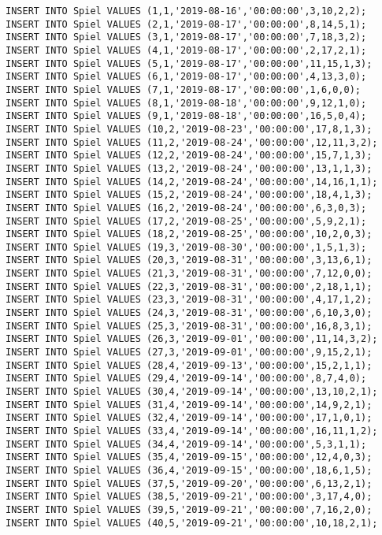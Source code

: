 \documentclass{bschlangaul-aufgabe}
\begin{document}
\begin{verbatim}
INSERT INTO Spiel VALUES (1,1,'2019-08-16','00:00:00',3,10,2,2);
INSERT INTO Spiel VALUES (2,1,'2019-08-17','00:00:00',8,14,5,1);
INSERT INTO Spiel VALUES (3,1,'2019-08-17','00:00:00',7,18,3,2);
INSERT INTO Spiel VALUES (4,1,'2019-08-17','00:00:00',2,17,2,1);
INSERT INTO Spiel VALUES (5,1,'2019-08-17','00:00:00',11,15,1,3);
INSERT INTO Spiel VALUES (6,1,'2019-08-17','00:00:00',4,13,3,0);
INSERT INTO Spiel VALUES (7,1,'2019-08-17','00:00:00',1,6,0,0);
INSERT INTO Spiel VALUES (8,1,'2019-08-18','00:00:00',9,12,1,0);
INSERT INTO Spiel VALUES (9,1,'2019-08-18','00:00:00',16,5,0,4);
INSERT INTO Spiel VALUES (10,2,'2019-08-23','00:00:00',17,8,1,3);
INSERT INTO Spiel VALUES (11,2,'2019-08-24','00:00:00',12,11,3,2);
INSERT INTO Spiel VALUES (12,2,'2019-08-24','00:00:00',15,7,1,3);
INSERT INTO Spiel VALUES (13,2,'2019-08-24','00:00:00',13,1,1,3);
INSERT INTO Spiel VALUES (14,2,'2019-08-24','00:00:00',14,16,1,1);
INSERT INTO Spiel VALUES (15,2,'2019-08-24','00:00:00',18,4,1,3);
INSERT INTO Spiel VALUES (16,2,'2019-08-24','00:00:00',6,3,0,3);
INSERT INTO Spiel VALUES (17,2,'2019-08-25','00:00:00',5,9,2,1);
INSERT INTO Spiel VALUES (18,2,'2019-08-25','00:00:00',10,2,0,3);
INSERT INTO Spiel VALUES (19,3,'2019-08-30','00:00:00',1,5,1,3);
INSERT INTO Spiel VALUES (20,3,'2019-08-31','00:00:00',3,13,6,1);
INSERT INTO Spiel VALUES (21,3,'2019-08-31','00:00:00',7,12,0,0);
INSERT INTO Spiel VALUES (22,3,'2019-08-31','00:00:00',2,18,1,1);
INSERT INTO Spiel VALUES (23,3,'2019-08-31','00:00:00',4,17,1,2);
INSERT INTO Spiel VALUES (24,3,'2019-08-31','00:00:00',6,10,3,0);
INSERT INTO Spiel VALUES (25,3,'2019-08-31','00:00:00',16,8,3,1);
INSERT INTO Spiel VALUES (26,3,'2019-09-01','00:00:00',11,14,3,2);
INSERT INTO Spiel VALUES (27,3,'2019-09-01','00:00:00',9,15,2,1);
INSERT INTO Spiel VALUES (28,4,'2019-09-13','00:00:00',15,2,1,1);
INSERT INTO Spiel VALUES (29,4,'2019-09-14','00:00:00',8,7,4,0);
INSERT INTO Spiel VALUES (30,4,'2019-09-14','00:00:00',13,10,2,1);
INSERT INTO Spiel VALUES (31,4,'2019-09-14','00:00:00',14,9,2,1);
INSERT INTO Spiel VALUES (32,4,'2019-09-14','00:00:00',17,1,0,1);
INSERT INTO Spiel VALUES (33,4,'2019-09-14','00:00:00',16,11,1,2);
INSERT INTO Spiel VALUES (34,4,'2019-09-14','00:00:00',5,3,1,1);
INSERT INTO Spiel VALUES (35,4,'2019-09-15','00:00:00',12,4,0,3);
INSERT INTO Spiel VALUES (36,4,'2019-09-15','00:00:00',18,6,1,5);
INSERT INTO Spiel VALUES (37,5,'2019-09-20','00:00:00',6,13,2,1);
INSERT INTO Spiel VALUES (38,5,'2019-09-21','00:00:00',3,17,4,0);
INSERT INTO Spiel VALUES (39,5,'2019-09-21','00:00:00',7,16,2,0);
INSERT INTO Spiel VALUES (40,5,'2019-09-21','00:00:00',10,18,2,1);

\end{verbatim}
\end{document}
